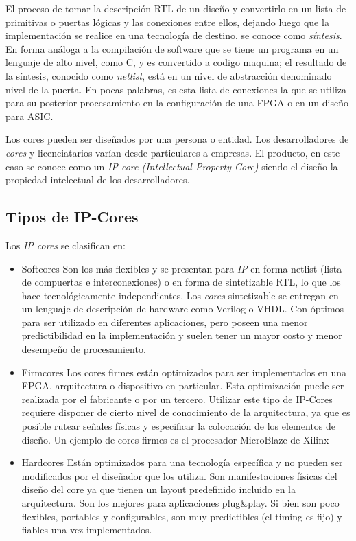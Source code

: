 El proceso de tomar la descripción RTL de un diseño y convertirlo en
un lista de primitivas o puertas lógicas y las conexiones entre ellos,
dejando luego que la implementación se realice en una tecnología de
destino, se conoce como \textit{síntesis}. En forma análoga a la
compilación de software que se tiene un programa en un lenguaje de
alto nivel, como C, y es convertido a codigo maquina; el resultado de
la síntesis, conocido como \textit{netlist}, está en un nivel de
abstracción denominado nivel de la puerta. En pocas palabras, es esta
lista de conexiones la que se utiliza para su posterior procesamiento
en la configuración de una FPGA o en un diseño para ASIC.
	
Los cores pueden ser diseñados por una persona o entidad. Los
desarrolladores de \textit{cores} y licenciatarios varían desde
particulares a empresas. El producto, en este caso se conoce como un
\textit{IP core (Intellectual Property Core)} siendo el diseño la
propiedad intelectual de los desarrolladores.
	
\subsection{Tipos de IP-Cores}

Los \textit{IP cores} se clasifican en:

\begin{itemize}
\item{Softcores} Son los más flexibles y se presentan para \textit{IP}
  en forma netlist (lista de compuertas e interconexiones) o en forma
  de sintetizable RTL, lo que los hace tecnológicamente
  independientes. Los \textit{cores} sintetizable se entregan en un
  lenguaje de descripción de hardware como Verilog o VHDL. Con óptimos
  para ser utilizado en diferentes aplicaciones, pero poseen una menor
  predictibilidad en la implementación y suelen tener un mayor costo y
  menor desempeño de procesamiento.

\item{Firmcores} Los cores firmes están optimizados para ser
  implementados en una FPGA, arquitectura o dispositivo en
  particular. Esta optimización puede ser realizada por el fabricante
  o por un tercero. Utilizar este tipo de IP-Cores requiere disponer
  de cierto nivel de conocimiento de la arquitectura, ya que es
  posible rutear señales físicas y especificar la colocación de los
  elementos de diseño. Un ejemplo de cores firmes es el procesador
  MicroBlaze de Xilinx~\cite{Etiqueta04}

\item{Hardcores} Están optimizados para una tecnología específica y no
  pueden ser modificados por el diseñador que los utiliza. Son
  manifestaciones físicas del diseño del core ya que tienen un layout
  predefinido incluido en la arquitectura. Son los mejores para
  aplicaciones plug\&play. Si bien son poco flexibles, portables y
  configurables, son muy predictibles (el timing es fijo) y fiables
  una vez implementados.
\end{itemize}

